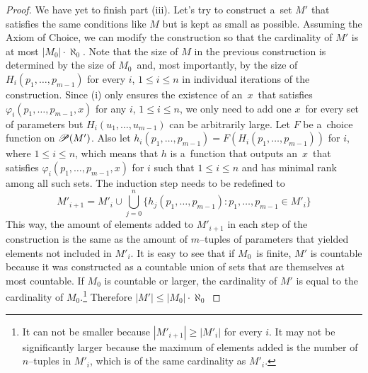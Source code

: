\begin{proof}
We have yet to finish part (iii).
Let's try to construct a~set $M'$ that satisfies the same conditions like $M$ but is kept as small as possible. Assuming the Axiom of Choice, we can modify the construction so that the cardinality of $M'$ is at most $|M_0| \cdot \aleph_0$. Note that the size of $M$ in the previous construction is determined by the size of $M_0$ and, most importantly, by the size of $H_i(p_1, \ldots, p_{m-1})$ for every $i$, $1 \leq i \leq n$ in individual iterations of the construction. Since (i) only ensures the existence of an~$x$~that satisfies $\varphi_i(p_1, \ldots, p_{m-1}, x)$ for any $i$, $1 \leq i \leq n$, we only need to add one $x$ for every set of parameters but $H_i(u_1, \dots, u_{m-1})$ can be arbitrarily large. Let $F$ be a~choice function on $\mathscr{P} (M')$. Also let $h_i(p_1, \ldots, p_{m-1}) = F(H_i(p_1, \ldots, p_{m-1}))$ for $i$, where $1 \leq i \leq n$, which means that $h$ is a~function that outputs an~$x$~that satisfies $\varphi_i(p_1, \ldots, p_{m-1}, x)$ for $i$ such that $1 \leq i \leq n$ and has minimal rank among all such sets. The induction step needs to be redefined to
\begin{equation}
M'_{i+1} = M'_i \cup \bigcup_{j=0}^n \{ h_j(p_1, \ldots, p_{m-1}): p_1, \ldots, p_{m-1} \in M'_i \}
\end{equation}
This way, the amount of elements added to $M'_{i+1}$ in each step of the construction is the same as the amount of $m$–tuples of parameters that yielded elements not included in $M'_i$. It is easy to see that if $M_0$ is finite, $M'$ is countable because it was constructed as a countable union of sets that are themselves at most countable. If $M_0$ is countable or larger, the cardinality of $M'$ is equal to the cardinality of $M_0$.\footnote{It can not be smaller because $|M'_{i+1}| \geq |M'_i|$ for every $i$. It may not be significantly larger because the maximum of elements added is the number of $n$–tuples in $M'_i$, which is of the same cardinality as $M'_i$.}
Therefore $|M'| \leq |M_0| \cdot \aleph_0$
\end{proof}


